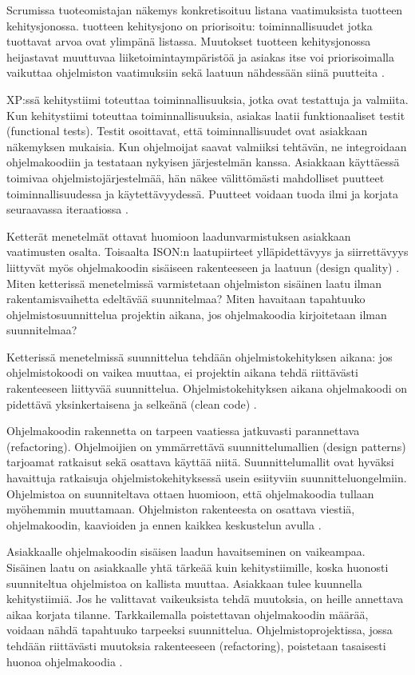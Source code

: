 \documentclass[finnish]{tktltiki2}
\theoremstyle{definition}
\theoremstyle{remark}
\begin{document}
Scrumissa tuoteomistajan näkemys konkretisoituu listana vaatimuksista tuotteen kehitysjonossa. tuotteen kehitysjono on priorisoitu: toiminnallisuudet jotka tuottavat arvoa ovat ylimpänä listassa. Muutokset tuotteen kehitysjonossa heijastavat muuttuvaa liiketoimintaympäristöä ja asiakas itse voi priorisoimalla vaikuttaa ohjelmiston vaatimuksiin sekä laatuun nähdessään siinä puutteita \cite{SCH09}.

XP:ssä kehitystiimi toteuttaa toiminnallisuuksia, jotka ovat testattuja ja valmiita. Kun kehitystiimi toteuttaa toiminnallisuuksia, asiakas laatii funktionaaliset testit (functional tests). Testit osoittavat, että toiminnallisuudet ovat asiakkaan näkemyksen mukaisia. Kun ohjelmoijat saavat valmiiksi tehtävän, ne integroidaan ohjelmakoodiin ja testataan nykyisen järjestelmän kanssa. Asiakkaan käyttäessä toimivaa ohjelmistojärjestelmää, hän näkee välittömästi mahdolliset puutteet toiminnallisuudessa ja käytettävyydessä. Puutteet voidaan tuoda ilmi ja korjata seuraavassa iteraatiossa \cite{BEC99}.

Ketterät menetelmät ottavat huomioon laadunvarmistuksen asiakkaan vaatimusten osalta. Toisaalta ISON:n laatupiirteet ylläpidettävyys ja siirrettävyys liittyvät myös ohjelmakoodin sisäiseen rakenteeseen ja laatuun (design quality) \cite{KIP96}. Miten ketterissä menetelmissä varmistetaan ohjelmiston sisäinen laatu ilman rakentamisvaihetta edeltävää suunnitelmaa? Miten havaitaan tapahtuuko ohjelmistosuunnittelua projektin aikana, jos ohjelmakoodia kirjoitetaan ilman suunnitelmaa?

Ketterissä menetelmissä suunnittelua tehdään ohjelmistokehityksen aikana: jos ohjelmistokoodi on vaikea muuttaa, ei projektin aikana tehdä riittävästi rakenteeseen liittyvää suunnittelua. Ohjelmistokehityksen aikana ohjelmakoodi on pidettävä yksinkertaisena ja selkeänä (clean code) \cite{FOW01b}.

Ohjelmakoodin rakennetta on tarpeen vaatiessa jatkuvasti parannettava (refactoring). Ohjelmoijien on ymmärrettävä suunnittelumallien (design patterns) tarjoamat ratkaisut sekä osattava käyttää niitä. Suunnittelumallit ovat hyväksi havaittuja ratkaisuja ohjelmistokehityksessä usein esiityviin suunnitteluongelmiin. Ohjelmistoa on suunniteltava ottaen huomioon, että ohjelmakoodia tullaan myöhemmin muuttamaan. Ohjelmiston rakenteesta on osattava viestiä, ohjelmakoodin, kaavioiden ja ennen kaikkea keskustelun avulla \cite{FOW01b}. 

Asiakkaalle ohjelmakoodin sisäisen laadun havaitseminen on vaikeampaa. Sisäinen laatu on asiakkaalle yhtä tärkeää kuin kehitystiimille, koska huonosti suunniteltua ohjelmistoa on kallista muuttaa. Asiakkaan tulee kuunnella kehitystiimiä. Jos he valittavat vaikeuksista tehdä muutoksia, on heille annettava aikaa korjata tilanne. Tarkkailemalla poistettavan ohjelmakoodin määrää, voidaan nähdä tapahtuuko tarpeeksi suunnittelua. Ohjelmistoprojektissa, jossa tehdään riittävästi muutoksia rakenteeseen (refactoring), poistetaan tasaisesti huonoa ohjelmakoodia \cite{FOW01b}.
\end{document}
